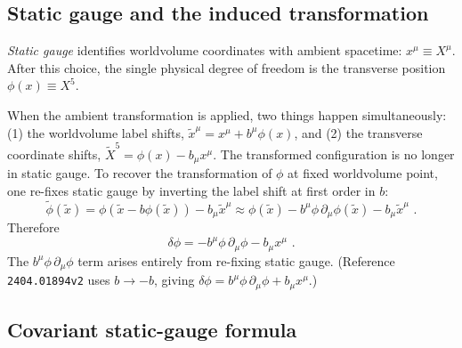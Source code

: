 \documentclass[11pt]{article}
\begin{document}
\subsection{Static gauge and the induced transformation}

\emph{Static gauge} identifies worldvolume coordinates with ambient spacetime: $x^\mu \equiv X^\mu$.
After this choice, the single physical degree of freedom is the transverse position $\phi(x) \equiv X^5$.

When the ambient transformation  is applied, two things happen simultaneously:
(1) the worldvolume label shifts, $\tilde{x}^\mu = x^\mu + b^\mu\phi(x)$, and (2) the transverse
coordinate shifts, $\tilde{X}^5 = \phi(x) - b_\mu x^\mu$.  The transformed configuration is no
longer in static gauge.  To recover the transformation of $\phi$ at fixed worldvolume point, one
re-fixes static gauge by inverting the label shift at first order in $b$:
\begin{equation}
\tilde\phi(\tilde{x}) = \phi\!\left(\tilde{x} - b\phi(\tilde{x})\right) - b_\mu\tilde{x}^\mu
\approx \phi(\tilde{x}) - b^\mu\phi\,\partial_\mu\phi(\tilde{x}) - b_\mu\tilde{x}^\mu \,\,.
\end{equation}
Therefore
\begin{equation}
\label{eq:flat-dbi-boost}
\delta\phi = -b^\mu\phi\,\partial_\mu\phi - b_\mu x^\mu \,\,.
\end{equation}
The $b^\mu\phi\,\partial_\mu\phi$ term arises entirely from re-fixing static gauge.
(Reference \texttt{2404.01894v2} uses $b\to -b$, giving
$\delta\phi = b^\mu\phi\,\partial_\mu\phi + b_\mu x^\mu$.)

\subsection{Covariant static-gauge formula}
\end{document}

